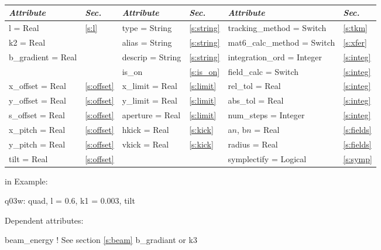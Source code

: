 \toffset
\begin{center}
\tt
\begin{tabular}{|l|l||l|l||l|l|} \hline
  {\sl Attribute} & {\sl Sec.}  & {\sl Attribute} & {\sl Sec.} & {\sl Attribute} & {\sl Sec.} \\ \hline
  l        = Real       & \ref{s:l}      & type = String      & \ref{s:string} & tracking\_method = Switch   & \ref{s:tkm}   \\ \hline
  k2       = Real       &                & alias = String     & \ref{s:string} & mat6\_calc\_method = Switch & \ref{s:xfer}  \\ \hline
  b\_gradient = Real    &                & descrip = String   & \ref{s:string} & integration\_ord = Integer  & \ref{s:integ} \\ \hline
                        &                & is\_on             & \ref{s:is_on}  & field\_calc = Switch        & \ref{s:integ} \\ \hline
  x\_offset  = Real     & \ref{s:offset} & x\_limit = Real    & \ref{s:limit}  & rel\_tol = Real             & \ref{s:integ} \\ \hline
  y\_offset  = Real     & \ref{s:offset} & y\_limit = Real    & \ref{s:limit}  & abs\_tol = Real             & \ref{s:integ} \\ \hline
  s\_offset  = Real     & \ref{s:offset} & aperture = Real    & \ref{s:limit}  & num\_steps = Integer        & \ref{s:integ} \\ \hline
  x\_pitch = Real       & \ref{s:offset} & hkick    = Real    & \ref{s:kick}   & a$n$, b$n$ = Real           & \ref{s:fields}\\ \hline
  y\_pitch = Real       & \ref{s:offset} & vkick    = Real    & \ref{s:kick}   & radius = Real               & \ref{s:fields}\\ \hline
  tilt     = Real       & \ref{s:offset} &                    &                & symplectify = Logical       & \ref{s:symp}  \\ \hline
\end{tabular}
\end{center}
\toffset

 in \noindent
Example:
\begin{example}
  q03w: quad, l = 0.6, k1 = 0.003, tilt
\end{example}

\vskip0.05in \noindent
Dependent attributes:
\begin{example}
  beam\_energy  ! See section \ref{s:beam}
  b\_gradiant or k3
\end{example}


